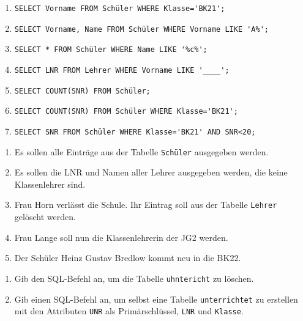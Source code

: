 \documentclass[a4paper,12pt, headsepline, ngerman]{scrartcl}
\begin{document}
    \begin{Exercise}[title={Gib an Hand der obigen Ausschnitte der Tabellen die Ausgabe folgender SQL-Befehle an. (14P)}, label=KA_SQL_A1]
        \begin{enumerate}[label=\alph*)]
            \item \lstinline!SELECT Vorname FROM Schüler WHERE Klasse='BK21';!
            \item \lstinline!SELECT Vorname, Name FROM Schüler WHERE Vorname LIKE 'A%';!
            \item \lstinline!SELECT * FROM Schüler WHERE Name LIKE '%c%';!
            \item \lstinline!SELECT LNR FROM Lehrer WHERE Vorname LIKE '____';!
            \item \lstinline!SELECT COUNT(SNR) FROM Schüler;!
            \item \lstinline!SELECT COUNT(SNR) FROM Schüler WHERE Klasse='BK21';!
            \item \lstinline!SELECT SNR FROM Schüler WHERE Klasse='BK21' AND SNR<20;!
        \end{enumerate}
    \end{Exercise}
	\begin{Exercise}[title={Gib jeweils den passenden SQL-Befehl an. Denke daran, dass obige Tabellen nur Ausschnitte zeigen und die Tabellen noch deutlich mehr Einträge enthalten. (15P)}, label=KA_SQL_A2]
		\begin{enumerate}[label=\alph*)]
			\item Es sollen alle Einträge aus der Tabelle \lstinline!Schüler! ausgegeben werden.
			\item Es sollen die LNR und Namen aller Lehrer ausgegeben werden, die keine Klassenlehrer sind.
			\item Frau Horn verlässt die Schule. Ihr Eintrag soll aus der Tabelle \lstinline!Lehrer! gelöscht werden.
			\item Frau Lange soll nun die Klassenlehrerin der JG2 werden.
            \item Der Schüler Heinz Gustav Bredlow kommt neu in die BK22.
		\end{enumerate}
	\end{Exercise}
	\begin{Exercise}[title={Franz hat versucht eine Tabelle namens \lstinline!unterrichtet! zu erstellen. Leider hat er die Tabelle \lstinline!uhntericht! genannt. (7P)}, label=KA_SQL_A3]
        \begin{enumerate}[label=\alph*)]
            \item Gib den SQL-Befehl an, um die Tabelle \lstinline!uhntericht! zu löschen.
            \item Gib einen SQL-Befehl an, um selbst eine Tabelle \lstinline!unterrichtet! zu erstellen mit den Attributen \lstinline!UNR! als Primärschlüssel, \lstinline!LNR! und \lstinline!Klasse!.
        \end{enumerate}
	\end{Exercise}
\end{document}
